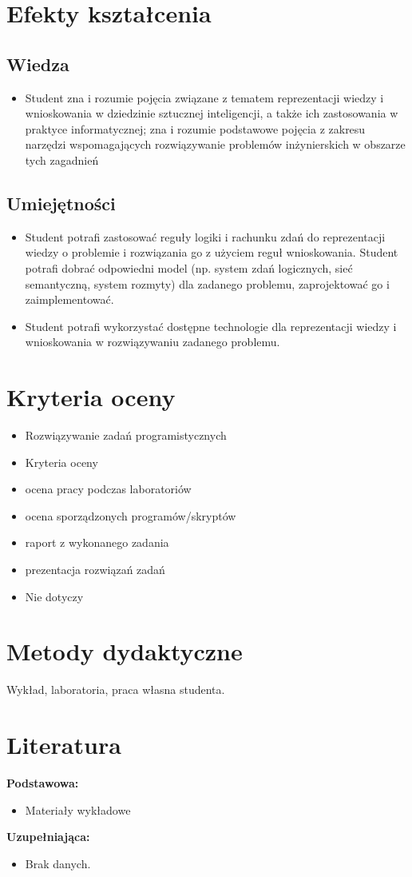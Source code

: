 \documentclass[12pt, a4paper]{article}
\begin{document}
\section{Efekty kształcenia}

\subsection*{Wiedza}
\begin{itemize}
  \item Student zna i rozumie pojęcia związane z tematem reprezentacji wiedzy i wnioskowania w dziedzinie sztucznej inteligencji, a także ich  zastosowania w praktyce informatycznej; zna i rozumie podstawowe pojęcia z zakresu narzędzi wspomagających rozwiązywanie problemów inżynierskich w obszarze tych zagadnień
\end{itemize}

\subsection*{Umiejętności}
\begin{itemize}
  \item Student potrafi zastosować reguły logiki i rachunku zdań do reprezentacji wiedzy o problemie i rozwiązania go z użyciem reguł wnioskowania.  Student potrafi dobrać odpowiedni model (np. system zdań logicznych, sieć semantyczną, system rozmyty) dla zadanego problemu, zaprojektować go i zaimplementować.
  \item Student potrafi wykorzystać dostępne technologie dla reprezentacji wiedzy i wnioskowania w rozwiązywaniu zadanego problemu.
\end{itemize}

\section{Kryteria oceny}

\begin{itemize}
  \item Rozwiązywanie zadań programistycznych
  \item Kryteria oceny
  \item ocena pracy podczas laboratoriów
  \item ocena sporządzonych programów/skryptów
  \item raport z wykonanego zadania
  \item prezentacja rozwiązań zadań
  \item Nie dotyczy
\end{itemize}

\section{Metody dydaktyczne}

Wykład, laboratoria, praca własna studenta.

\section{Literatura}

\textbf{Podstawowa:}
\begin{itemize}
  \item Materiały wykładowe
\end{itemize}

\textbf{Uzupełniająca:}
\begin{itemize}
  \item Brak danych.
\end{itemize}
\end{document}

